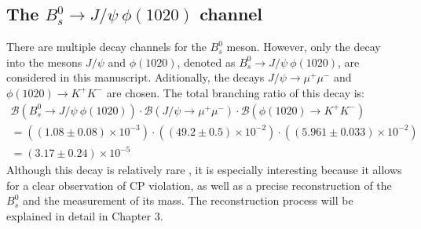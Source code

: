 \subsection{The $B^0_s \to J/\psi \ \phi(1020)$ channel}
\label{subsec:channel}
There are multiple decay channels for the $B^0_s$ meson. However, only the decay into the mesons $J/\psi$ and $\phi(1020)$, denoted as $B^0_s \to J/\psi \ \phi(1020)$, are considered in this manuscript. Aditionally, the decays $J/\psi \to \mu^{+} \mu^{-}$ and $\phi(1020) \to K^{+} K^{-}$ are chosen. The total branching ratio of this decay is:
\begin{equation}
	\label{eq:br}
	\begin{split}
	\mathcal{B} \left(B^0_s \to J/\psi \ \phi(1020) \right) \cdot	\mathcal{B} \left(J/\psi \to \mu^{+} \mu^{-} \right) \cdot \mathcal{B} \left(\phi(1020) \to K^{+} K^{-} \right)  \\
	 = ((1.08 \pm 0.08) \times 10^{-3}) \cdot ((49.2 \pm 0.5) \times 10^{-2}) \cdot ((5.961 \pm 0.033) \times 10^{-2}) \\ = (3.17 \pm 0.24) \times 10^{-5}
	\end{split}
\end{equation}
Although this decay is relatively rare \cite{bragagnolo2021measurement}, it is especially interesting because it allows for a clear observation of CP violation, as well as a precise reconstruction of the $B^0_s$ and the measurement of its mass. The reconstruction process will be explained in detail in Chapter 3.